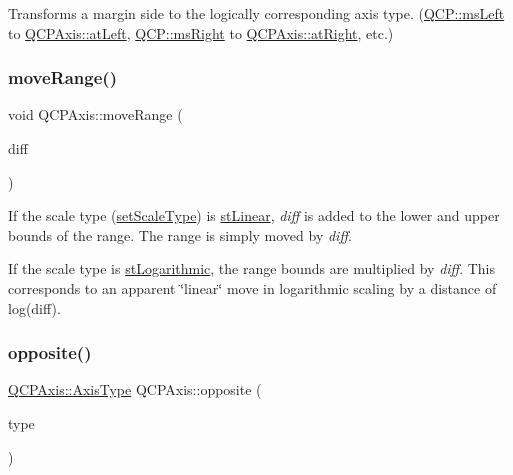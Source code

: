 Transforms a margin side to the logically corresponding axis type. (\hyperlink{namespace_q_c_p_a7e487e3e2ccb62ab7771065bab7cae54a9500c8bfcc9e80b9dff0a8e00e867f07}{Q\+C\+P\+::ms\+Left} to \hyperlink{class_q_c_p_axis_ae2bcc1728b382f10f064612b368bc18aaf84aa6cac6fb6099f54a2cbf7546b730}{Q\+C\+P\+Axis\+::at\+Left}, \hyperlink{namespace_q_c_p_a7e487e3e2ccb62ab7771065bab7cae54a93c719593bb2b94ed244d52c86d83b65}{Q\+C\+P\+::ms\+Right} to \hyperlink{class_q_c_p_axis_ae2bcc1728b382f10f064612b368bc18aadf5509f7d29199ef2f263b1dd224b345}{Q\+C\+P\+Axis\+::at\+Right}, etc.) \mbox{\label{class_q_c_p_axis_a18f3a68f2b691af1fd34b6593c886630}} 
\subsubsection{\texorpdfstring{move\+Range()}{moveRange()}}
{\footnotesize\ttfamily void Q\+C\+P\+Axis\+::move\+Range (\begin{DoxyParamCaption}\item[{double}]{diff }\end{DoxyParamCaption})}

If the scale type (\hyperlink{class_q_c_p_axis_adef29cae617af4f519f6c40d1a866ca6}{set\+Scale\+Type}) is \hyperlink{class_q_c_p_axis_a36d8e8658dbaa179bf2aeb973db2d6f0aff6e30a11a828bc850caffab0ff994f6}{st\+Linear}, {\itshape diff} is added to the lower and upper bounds of the range. The range is simply moved by {\itshape diff}.

If the scale type is \hyperlink{class_q_c_p_axis_a36d8e8658dbaa179bf2aeb973db2d6f0abf5b785ad976618816dc6f79b73216d4}{st\+Logarithmic}, the range bounds are multiplied by {\itshape diff}. This corresponds to an apparent \char`\"{}linear\char`\"{} move in logarithmic scaling by a distance of log(diff). \mbox{\label{class_q_c_p_axis_aa85ba73dfee6483e23825461b725e363}} 
\subsubsection{\texorpdfstring{opposite()}{opposite()}}
{\footnotesize\ttfamily \hyperlink{class_q_c_p_axis_ae2bcc1728b382f10f064612b368bc18a}{Q\+C\+P\+Axis\+::\+Axis\+Type} Q\+C\+P\+Axis\+::opposite (\begin{DoxyParamCaption}\item[{\hyperlink{class_q_c_p_axis_ae2bcc1728b382f10f064612b368bc18a}{Q\+C\+P\+Axis\+::\+Axis\+Type}}]{type }\end{DoxyParamCaption})\hspace{0.3cm}{\ttfamily [static]}}

